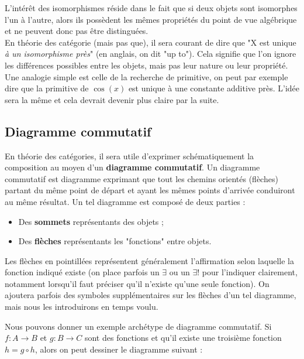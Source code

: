 \documentclass{article}
\begin{document}
L'intérêt des isomorphismes réside dans le fait que si deux objets sont isomorphes l'un à l'autre, alors ils possèdent les mêmes propriétés du point de vue algébrique et ne peuvent donc pas être distinguées.\\

En théorie des catégorie (mais pas que), il sera courant de dire que "X est unique \textit{à un isomorphisme près}" (en anglais, on dit "up to"). Cela signifie que l'on ignore les différences possibles entre les objets, mais pas leur nature ou leur propriété. Une analogie simple est celle de la recherche de primitive, on peut par exemple dire que la primitive de $\cos(x)$ est unique à une constante additive près. L'idée sera la même et cela devrait devenir plus claire par la suite.

\subsection{Diagramme commutatif}
En théorie des catégories, il sera utile d'exprimer schématiquement la composition au moyen d'un \textbf{diagramme commutatif}. Un diagramme commutatif est diagramme exprimant que tout les chemins orientés (flèches) partant du même point de départ et ayant les mêmes points d'arrivée conduiront au même résultat. Un tel diagramme est composé de deux parties :

\begin{itemize}[label=\textbullet]
    \item Des \textbf{sommets} représentants des objets ;
    \item Des \textbf{flèches} représentants les "fonctions" entre objets.
\end{itemize}

\noindent
Les flèches en pointillées représentent généralement l'affirmation selon laquelle la fonction indiqué existe (on place parfois un $\exists$ ou un $\exists!$ pour l'indiquer clairement, notamment lorsqu'il faut préciser qu'il n'existe qu'une seule fonction). On ajoutera parfois des symboles supplémentaires sur les flèches d'un tel diagramme, mais nous les introduirons en temps voulu.\\

\begin{example}[]{}
    Nous pouvons donner un exemple archétype de diagramme commutatif. Si $f:A\to B$ et $g:B\to C$ sont des fonctions et qu'il existe une troisième fonction $h=g\circ h$, alors on peut dessiner le diagramme suivant :
    \begin{center}
    \end{center}
\end{example}
\end{document}
